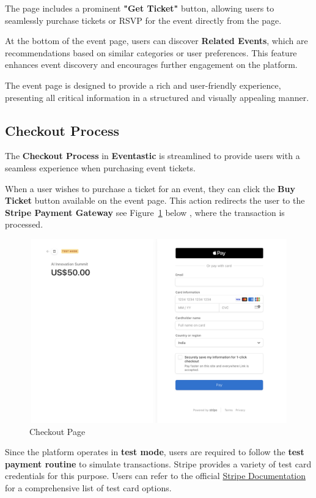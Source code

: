 The page includes a prominent \textbf{"Get Ticket"} button, allowing users to seamlessly purchase tickets or RSVP for the event directly from the page.

At the bottom of the event page, users can discover \textbf{Related Events}, which are recommendations based on similar categories or user preferences. This feature enhances event discovery and encourages further engagement on the platform.

The event page is designed to provide a rich and user-friendly experience, presenting all critical information in a structured and visually appealing manner.


\subsection{Checkout Process}
The \textbf{Checkout Process} in \textbf{Eventastic} is streamlined to provide users with a seamless experience when purchasing event tickets. 

When a user wishes to purchase a ticket for an event, they can click the \textbf{Buy Ticket} button available on the event page. This action redirects the user to the \textbf{Stripe Payment Gateway} see Figure~\ref{fig:checkout} below , where the transaction is processed.


\begin{figure}[H]
	\centering	\includegraphics[width=1.0\textwidth,height=300px,frame]{images/checkout.png}
	\caption{Checkout Page}
        \label{fig:checkout}
\end{figure}

Since the platform operates in \textbf{test mode}, users are required to follow the \textbf{test payment routine} to simulate transactions. Stripe provides a variety of test card credentials for this purpose. Users can refer to the official \href{https://stripe.com/docs/testing}{Stripe Documentation} for a comprehensive list of test card options. 

